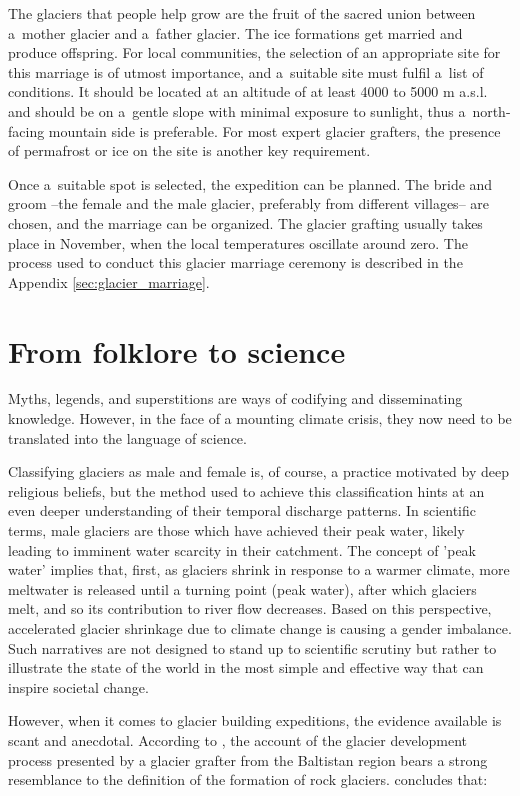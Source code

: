 The glaciers that people help grow are the fruit of the sacred union between a mother glacier and a father
glacier. The ice formations get married and produce offspring. For local communities, the selection of an
appropriate site for this marriage is of utmost importance, and a suitable site must fulfil a list of
conditions. It should be located at an altitude of at least 4000 to 5000 m \ac{a.s.l.} and should be on
a gentle slope with minimal exposure to sunlight, thus a north-facing mountain side is
preferable. For most expert glacier grafters, the presence of permafrost or ice on the site is another key
requirement. 

Once a suitable spot is selected, the expedition can be planned. The bride and groom –the female and the male
glacier, preferably from different villages– are chosen, and the marriage can be organized. The glacier grafting
usually takes place in November, when the local temperatures oscillate around zero. The process used to conduct
this glacier marriage ceremony is described in the Appendix \ref{sec:glacier_marriage}.

\section{From folklore to science}

Myths, legends, and superstitions are ways of codifying and disseminating knowledge. However, in the face of a
mounting climate crisis, they now need to be translated into the language of science. 

Classifying glaciers as male and female is, of course, a practice motivated by deep religious beliefs, but the
method used to achieve this classification hints at an even deeper understanding of their temporal discharge
patterns. In scientific terms, male glaciers are those which have achieved their peak water, likely leading to
imminent water scarcity in their catchment. The concept of 'peak water' implies that, first, as glaciers shrink
in response to a warmer climate, more meltwater is released until a turning point (peak water), after which
glaciers melt, and so its contribution to river flow decreases. Based on this perspective, accelerated glacier
shrinkage due to climate change is causing a gender imbalance. Such narratives are not designed to stand up to
scientific scrutiny but rather to illustrate the state of the world in the most simple and effective way that
can inspire societal change. 

However, when it comes to glacier building expeditions, the evidence available is scant and anecdotal. According
to \citet{tveitenGlacierGrowingLocal2007}, the account of the glacier development process presented by a glacier
grafter from the Baltistan region bears a strong resemblance to the definition of the formation of rock glaciers.
\citet{tveitenGlacierGrowingLocal2007} concludes that: 

